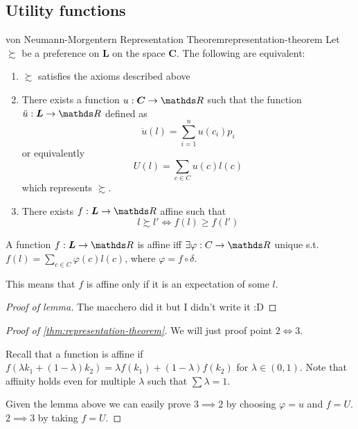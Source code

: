 \documentclass[12pt]{extarticle}
\begin{document}
\subsection{Utility functions}

\begin{theorem}{von Neumann-Morgentern Representation Theorem}{representation-theorem}
	Let $\succsim$ be a preference on $\bm L$ on the space $\bm C$.
	The following are equivalent:
	\begin{enumerate}
		\item $\succsim$ satisfies the axioms described above
		\item There exists a function $u:\bm C \to \R$ such that the function $\ddot u : \bm L \to \R$ defined as
		      \begin{equation}
			      \ddot u(l) = \sum^n_{i = 1} u(c_i) p_i
		      \end{equation}
		      or equivalently
		      \begin{equation}
			      U(l) = \sum_{c \in C} u(c) l(c)
		      \end{equation}
		      which represents $\succsim$.
		\item There exists $f:\bm L \to \R$ affine such that
		      \begin{equation}
			      l \succsim l' \iff f(l) \geq f(l')
		      \end{equation}
	\end{enumerate}
\end{theorem}

\begin{lemma}{}{}
	A function $f:\bm L \to \R$ is affine iff $\exists \varphi : C \to \R$ unique s.t. $f(l) = \sum_{c \in C} \varphi(c) l(c)$, where $\varphi = f \circ \delta$.

	This means that $f$ is affine only if it is an expectation of some $l$.
\end{lemma}
\begin{proof}[Proof of lemma]
	The macchero did it but I didn't write it :D
\end{proof}

\begin{proof}[Proof of \cref{thm:representation-theorem}]
	We will just proof point $2 \iff 3$.

	Recall that a function is affine if $f(\lambda k_1 + (1- \lambda) k_2) = \lambda f (k_1) + (1 - \lambda ) f(k_2)$ for $\lambda \in (0, 1)$.
	Note that affinity holds even for multiple $\lambda$ such that $\sum \lambda = 1$.

	Given the lemma above we can easily prove $3 \implies 2$ by choosing $\varphi = u$ and $f = U$.
	$2 \implies 3$  by taking $f = U$.
\end{proof}
\end{document}
